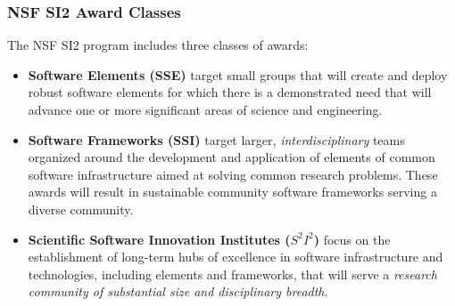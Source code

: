 \begin{frame}
\frametitle{NSF SI2 Award Classes}

The NSF SI2 program includes three classes of awards:
\begin{itemize}
\item {\bf Software Elements (SSE)} target small groups that will create and deploy robust software elements for which there is a demonstrated need that will advance one or more significant areas of science and engineering.

\item {\bf Software Frameworks (SSI)} target larger, {\em interdisciplinary} teams organized around the development and application of elements of common software infrastructure aimed at solving common research problems. These awards will result in sustainable community software frameworks serving a diverse community.

\item {\bf Scientific Software Innovation Institutes ($ S^2 I^2 $)} focus on the establishment of long-term hubs of excellence in software infrastructure and technologies, including elements and frameworks, that will serve a {\em research community of substantial size and disciplinary breadth}.
\end{itemize}

\end{frame}


